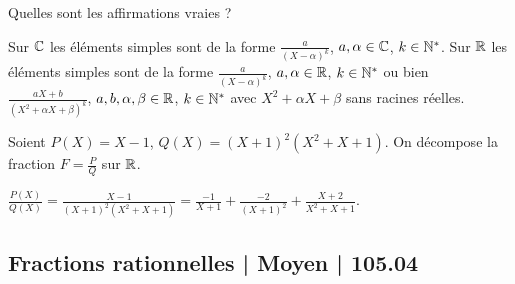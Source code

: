 \begin{question}
Quelles sont les affirmations vraies ?
\begin{answers}



 
\end{answers}
\begin{explanations}
Sur $\mathbb{C}$ les éléments simples sont de la forme $\frac{a}{(X-\alpha)^k}$, $a,\alpha \in \mathbb{C}$, $k\in\mathbb{N}^*$.
Sur $\mathbb{R}$ les éléments simples sont de la forme $\frac{a}{(X-\alpha)^k}$, $a,\alpha \in \mathbb{R}$, $k \in \mathbb{N}^*$ ou bien
$\frac{aX+b}{(X^2+\alpha X+\beta)^k}$, $a,b,\alpha,\beta \in \mathbb{R}$, $k \in \mathbb{N}^*$ avec 
$X^2+\alpha X+\beta$ sans racines réelles.
\end{explanations}
\end{question}


\begin{question}
Soient $P(X)=X-1$, $Q(X)=(X+1)^2(X^2+X+1)$. On décompose la fraction $F = \frac{P}{Q}$ sur $\mathbb{R}$.
\begin{answers}
    
    
    
 
\end{answers}
\begin{explanations}
$\frac{P(X)}{Q(X)} = \frac{X-1}{(X+1)^2(X^2+X+1)}
= \frac{-1}{X+1}+\frac{-2}{(X+1)^2}+\frac{X+2}{X^2+X+1}$.
\end{explanations}
\end{question}



\subsection{Fractions rationnelles | Moyen | 105.04}



